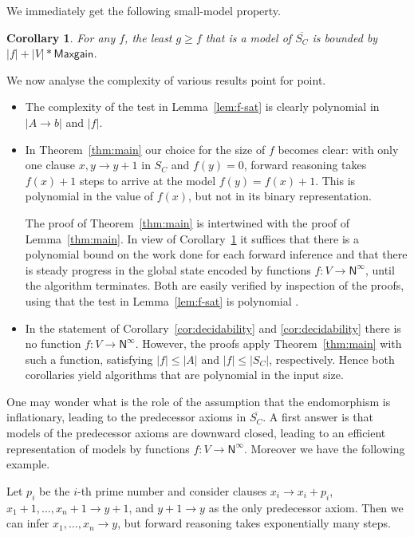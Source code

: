 \documentclass[11pt,a4paper]{article}
\newtheorem{corollary}[theorem]{Corollary}
\newcommand{\N}{\mathsf{N}}
\newcommand\Ninf{\N^\infty}
\newcommand\M{\mathsf{Maxgain}}
\newcommand\upS[1]{\overline{S_{#1}}}
\begin{document}
We immediately get the following small-model property.
\begin{corollary}\label{cor:small-model}
For any $f$, the least $g\geq f$ that is a model of $\upS{C}$
is bounded by $|f|+|V|*\M$.
\end{corollary}

We now analyse the complexity of various results point for point.

\begin{itemize}

\item\label{it:f-sat} The complexity of the test in Lemma~\ref{lem:f-sat}
is clearly polynomial in $|A\to b|$ and $|f|$.

\item In Theorem~\ref{thm:main} our choice for the size of $f$ becomes clear:
with only one clause $x,y \to y+1$ in $S_C$ and $f(y)=0$, forward reasoning
takes $f(x)+1$ steps to arrive at the model $f(y)=f(x)+1$.
This is polynomial in the value of $f(x)$, but not in its
binary representation.

The proof of Theorem~\ref{thm:main} is intertwined with the
proof of Lemma~\ref{thm:main}. In view of Corollary~\ref{cor:small-model}
it suffices that there is a polynomial bound on the work done for each 
forward inference and that there is steady progress in the global state encoded by
functions $f: V\to\Ninf$, until the algorithm terminates.
Both are easily verified by inspection of the proofs,
using that the test in Lemma~\ref{lem:f-sat} is polynomial . 
 
\item\label{it:Coros} In the statement of Corollary~\ref{cor:decidability}
and \ref{cor:decidability} there is no function $f: V\to\Ninf$. 
However, the proofs apply Theorem~\ref{thm:main} with such a function,
satisfying $|f| \leq |A|$ and $|f| \leq |S_C|$, respectively.
Hence both corollaries yield algorithms that are polynomial in the input size.

\end{itemize}

One may wonder what is the role of the assumption that the endomorphism
is inflationary, leading to the predecessor axioms in $\upS{C}$. A first
answer is that models of the predecessor axioms are downward closed,
leading to an efficient representation of models by functions $f: V\to\Ninf$.
Moreover we have the following example.

Let $p_i$ be the $i$-th prime number and consider clauses $x_i \to x_i + p_i$,
$x_1+1,\ldots,x_n+1 \to y+1$, and $y+1 \to y$ as the only predecessor axiom.
Then we can infer $x_1,\ldots,x_n \to y$, but forward reasoning takes
exponentially many steps. 
\end{document}
